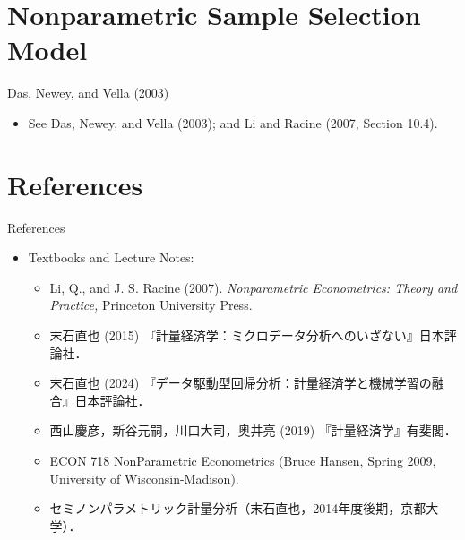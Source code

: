 \documentclass[xcolor=svgnames,dvipdfmx,cjk]{beamer}
\theoremstyle{example}
\begin{document}
\section{Nonparametric Sample Selection Model}

\begin{frame}{Das, Newey, and Vella (2003)}
      \begin{itemize}
            \item See Das, Newey, and Vella (2003); and Li and Racine (2007, Section 10.4).
      \end{itemize}
\end{frame}



\section{References}

\begin{frame}{References}
      \begin{itemize}
            \item Textbooks and Lecture Notes:
                  \begin{itemize}
                        \item Li, Q., and J. S. Racine (2007). 
                              \textit{Nonparametric Econometrics: Theory and Practice,} 
                              Princeton University Press.
                        \item 末石直也 (2015) 『計量経済学：ミクロデータ分析へのいざない』日本評論社．
                        \item 末石直也 (2024) 『データ駆動型回帰分析：計量経済学と機械学習の融合』日本評論社．
                        \item 西山慶彦，新谷元嗣，川口大司，奥井亮 (2019) 『計量経済学』有斐閣．
                        \item ECON 718 NonParametric Econometrics (Bruce Hansen, Spring 2009, University of Wisconsin-Madison).
                        \item セミノンパラメトリック計量分析（末石直也，2014年度後期，京都大学）．
                  \end{itemize}
      \end{itemize}
\end{frame}
\end{document}
